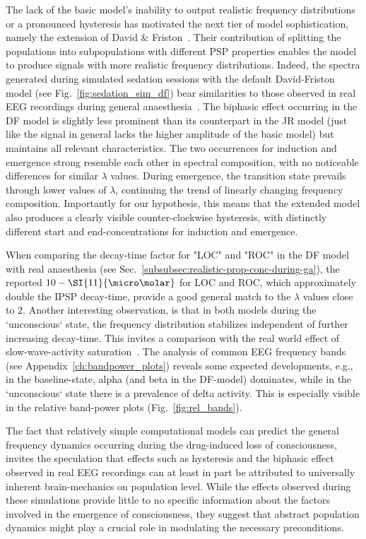 The lack of the basic model's inability to output realistic frequency distributions or a pronounced hysteresis
has motivated the next tier of model sophistication, namely the extension of David \&
Friston~\cite{david_neural_2003}.
Their contribution of splitting the populations into subpopulations with different PSP properties
enables the model to produce signals with more realistic frequency distributions.
Indeed, the spectra generated during simulated sedation sessions with the default David-Friston model
(see Fig.~\ref{fig:sedation_sim_df}) bear similarities to those observed in
real EEG recordings during general anaesthesia~\cite{purdon_electroencephalogram_2013}.
The biphasic effect occurring in the DF model is slightly less prominent than its counterpart in the JR model
(just like the signal in general lacks the higher amplitude of the basic model)
but maintains all relevant characteristics.
The two occurrences for induction and emergence strong resemble each other in spectral composition,
with no noticeable differences for similar $\lambda$ values.
During emergence, the transition state prevails through lower values of $\lambda$,
continuing the trend of linearly changing frequency composition.
Importantly for our hypothesis,
this means that the extended model also produces a clearly visible counter-clockwise hysteresis,
with distinctly different start and end-concentrations for induction and emergence.

When comparing the decay-time factor for "LOC" and "ROC" in the DF model
with real anaesthesia (see Sec.~\ref{subsubsec:realistic-prop-conc-during-ga}),
the reported $10-\SI{11}{\micro\molar}$ for LOC and ROC,
which approximately double the IPSP decay-time,
provide a good general match to the $\lambda$ values close to $2$.
Another interesting observation, is that in both models during the `unconscious` state,
the frequency distribution stabilizes independent of further increasing decay-time.
This invites a comparison with the real world effect of slow-wave-activity
saturation~\cite{ni_mhuircheartaigh_slow_wave_2013}.
The analysis of common EEG frequency bands (see Appendix~\ref{ch:bandpower_plots}) reveals
some expected developments, e.g., in the baseline-state, alpha (and beta in the DF-model) dominates,
while in the `unconscious` state there is a prevalence of delta activity.
This is especially visible in the relative band-power plots (Fig.~\ref{fig:rel_bands}).

The fact that relatively simple computational models can predict the general frequency dynamics occurring during the
drug-induced loss of consciousness,
invites the speculation that effects such as hysteresis and the biphasic effect observed in real EEG recordings can at
least in part be attributed to universally inherent brain-mechanics on population level.
While the effects observed during these simulations provide little to no specific information about the factors
involved in the emergence of consciousness,
they suggest that abstract population dynamics might play a crucial role in modulating the necessary preconditions.

